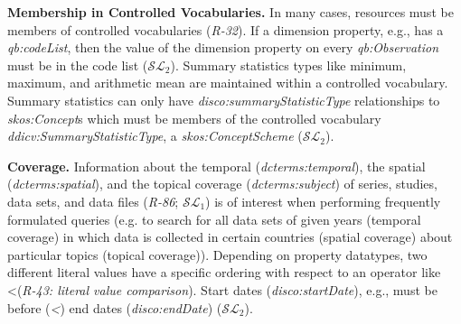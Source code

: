 \documentclass{llncs}
\newenvironment{DL}{
  \vspace{0cm}
  \begin{tabular}{r l}

}{
  \end{tabular}
}
\begin{document}
{{\textbf{Membership in Controlled Vocabularies.}
In many cases, resources must be members of controlled vocabularies (\emph{R-32}).
If a dimension property, e.g., has a \emph{qb:codeList},
then the value of the dimension property on every \emph{qb:Observation} must be in the code list ($\mathcal{SL}_{2}$).
Summary statistics types like minimum, maximum, and arithmetic mean are maintained within a controlled vocabulary.  
Summary statistics can only have \emph{disco:summaryStatisticType} relationships to \emph{skos:Concept}s which must be members of the controlled vocabulary \emph{ddicv:SummaryStatisticType}, a \emph{skos:ConceptScheme} ($\mathcal{SL}_{2}$).


\textbf{Coverage.}
Information about the temporal (\emph{dcterms:temporal}), the spatial (\emph{dcterms:spatial}), and the topical coverage (\emph{dcterms:subject}) of series, studies, data sets, and data files (\emph{R-86}; $\mathcal{SL}_{1}$) is of interest when performing frequently formulated queries 
	(e.g. to search for all data sets of given years (temporal coverage) in which data is collected in certain countries (spatial coverage) about particular topics (topical coverage)).
Depending on property datatypes,
two different literal values have
a specific ordering with respect to an operator like \textless (\emph{R-43: literal value comparison}).
Start dates (\emph{disco:startDate}), e.g., must be before (\emph{\textless}) end dates (\emph{disco:endDate}) ($\mathcal{SL}_{2}$).

}}
\end{document}
